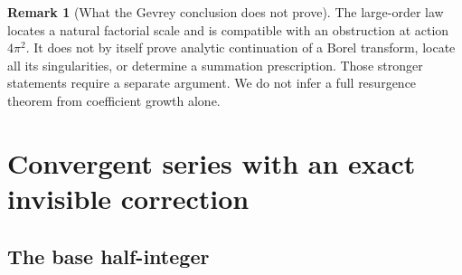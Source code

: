 \documentclass[11pt,a4paper]{article}
\numberwithin{equation}{section}
\theoremstyle{definition}
\newtheorem{remark}[theorem]{Remark}
\begin{document}
\begin{remark}[What the Gevrey conclusion does not prove]
The large-order law locates a natural factorial scale and is compatible with an obstruction at action $4\pi^2$. It does not by itself prove analytic continuation of a Borel transform, locate all its singularities, or determine a summation prescription. Those stronger statements require a separate argument. We do not infer a full resurgence theorem from coefficient growth alone.
\end{remark}

\section{Convergent series with an exact invisible correction}
\label{sec:half}

\subsection{The base half-integer}
\end{document}
